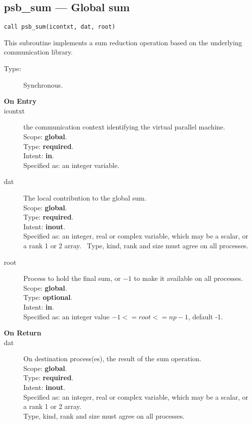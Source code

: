 \clearpage\subsection*{psb\_sum --- Global sum}

\begin{verbatim}
call psb_sum(icontxt, dat, root)
\end{verbatim}

This subroutine implements a sum reduction  operation based on the
underlying communication library. 
\begin{description}
\item[Type:] Synchronous.
\item[\bf  On Entry ]
\item[icontxt] the communication context identifying the virtual
  parallel machine.\\
Scope: {\bf global}.\\
Type: {\bf required}.\\
Intent: {\bf in}.\\
Specified as: an integer variable.
\item[dat] The local contribution to the global sum.\\
Scope: {\bf global}.\\
Type: {\bf required}.\\
Intent: {\bf inout}.\\
Specified as: an integer, real or complex variable, which may be a
scalar, or a rank 1 or 2 array. \
Type, kind, rank and size must agree on all processes.
\item[root] Process to hold the final sum, or $-1$ to make it available
  on all processes.\\
Scope: {\bf global}.\\
Type: {\bf optional}.\\
Intent: {\bf in}.\\
Specified as: an integer value $-1<= root <= np-1$, default -1. \
\end{description}


\begin{description}
\item[\bf On Return]
\item[dat] On destination process(es), the result of the sum operation.\\
Scope: {\bf global}.\\
Type: {\bf required}.\\
Intent: {\bf inout}.\\
Specified as: an integer, real or complex variable, which may be a
scalar, or a rank 1 or 2 array. \\
Type, kind, rank and size must agree on all processes.
\end{description}

